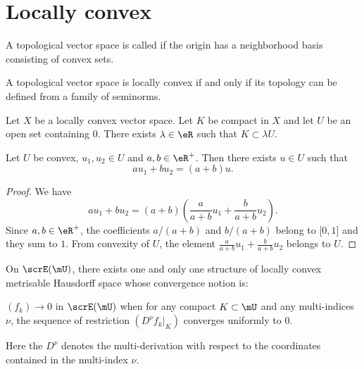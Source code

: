 \section{Locally convex}

\begin{definition}        \label{DEFooCGJBooSvDpyC}
    A topological vector space is called  if the origin has a neighborhood basis consisting of convex sets.
\end{definition}

\begin{proposition}
    A topological vector space is locally convex if and only if its topology can be defined from a family of seminorms.
\end{proposition}

\begin{lemma}        \label{LEMooDVZWooWKRQWC}       
    Let \( X\) be a locally convex vector space. Let \( K\) be compact in \( X\) and let \( U\) be an open set containing \( 0\). There exists \( \lambda\in \eR\) such that \( K\subset \lambda U\).
\end{lemma}

\begin{lemma}   \label{LEMooAHUMooBwxzPj}
    Let \( U\) be convex, \( u_1, u_2\in U\) and \( a,b\in \eR^+\). Then there exists \( u\in U\) such that
    \begin{equation}
        au_1+bu_2=(a+b)u.
    \end{equation}
\end{lemma}

\begin{proof}
    We have
    \begin{equation}
        au_1+bu_2=(a+b)\left( \frac{ a }{ a+b }u_1+\frac{ b }{ a+b }u_2 \right).
    \end{equation}
    Since \( a,b\in \eR^+\), the coefficients \( a/(a+b)\) and \( b/(a+b)\) belong to \( \mathopen[ 0 , 1 \mathclose]\) and they sum to \( 1\). From convexity of \( U\), the element \( \frac{ a }{ a+b }u_1+\frac{ b }{ a+b }u_2\) belongs to \( U\).
\end{proof}

\begin{proposition}    \label{prop:topo_E}
On $\scrE(\mU)$, there exists one and only one structure of locally convex metrisable Hausdorff space whose convergence notion is:

$(f_k)\to 0$ in $\scrE(\mU)$ when for any compact $K\subset\mU$ and any multi-indices $\nu$, the sequence of restriction $(D^{\nu}f_k|_K)$ converges uniformly to $0$.

Here the $D^{\nu}$ denotes the multi-derivation with respect to the coordinates contained in the multi-index $\nu$.
\end{proposition}

